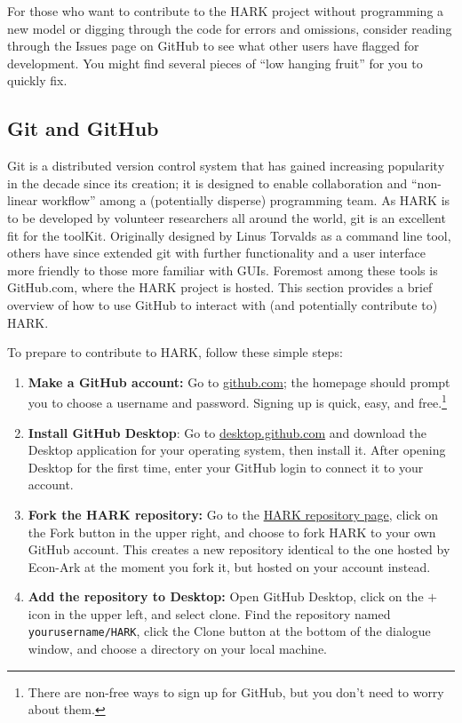 \documentclass[12pt,titlepage,letterpaper]{econtex}
\begin{document}
For those who want to contribute to the HARK project without programming a new model or digging through the code for errors and omissions, consider reading through the Issues page on GitHub to see what other users have flagged for development.  You might find several pieces of ``low hanging fruit'' for you to quickly fix.

\subsection{Git and GitHub}\label{sec:GitHub}

Git is a distributed version control system that has gained increasing popularity in the decade since its creation; it is designed to enable collaboration and ``non-linear workflow'' among a (potentially disperse) programming team.  As HARK is to be developed by volunteer researchers all around the world, git is an excellent fit for the toolKit.  Originally designed by Linus Torvalds as a command line tool, others have since extended git with further functionality and a user interface more friendly to those more familiar with GUIs.  Foremost among these tools is GitHub.com, where the HARK project is hosted.  This section provides a brief overview of how to use GitHub to interact with (and potentially contribute to) HARK.

To prepare to contribute to HARK, follow these simple steps:
\begin{enumerate}
\item \textbf{Make a GitHub account:} Go to \href{https://www.github.com}{github.com}; the homepage should prompt you to choose a username and password.  Signing up is quick, easy, and free.\footnote{There are non-free ways to sign up for GitHub, but you don't need to worry about them.}

\item \textbf{Install GitHub Desktop}: Go to \href{https://desktop.github.com/}{desktop.github.com} and download the Desktop application for your operating system, then install it.  After opening Desktop for the first time, enter your GitHub login to connect it to your account.

\item \textbf{Fork the HARK repository:} Go to the \href{https://github.com/econ-ark/HARK}{HARK repository page}, click on the Fork button in the upper right, and choose to fork HARK to your own GitHub account.  This creates a new repository identical to the one hosted by Econ-Ark at the moment you fork it, but hosted on your account instead.

\item \textbf{Add the repository to Desktop:} Open GitHub Desktop, click on the $+$ icon in the upper left, and select clone.  Find the repository named \texttt{yourusername/HARK}, click the Clone button at the bottom of the dialogue window, and choose a directory on your local machine.
\end{enumerate}
\end{document}
